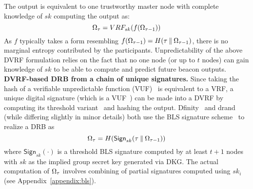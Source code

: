 The output is equivalent to one trustworthy master node with complete knowledge of $sk$ computing the output as:
\[
\Omega_\tau = VRF_{sk}(f(\Omega_{\tau - 1}))
\]
As $f$ typically takes a form resembling $f(\Omega_{\tau - 1}) = H(\tau \mathbin\Vert \Omega_{\tau - 1})$, there is no marginal entropy contributed by the participants. Unpredictability of the above DVRF formulation relies on the fact that no one node (or up to $t$ nodes) can gain knowledge of $sk$ to be able to compute and predict future beacon outputs.\\

\noindent\textbf{DVRF-based DRB from a chain of unique signatures.} Since taking the hash of a verifiable unpredictable function (VUF)~\cite{micali1999verifiable} is equivalent to a VRF, a unique digital signature (which is a VUF~\cite{dodis2005verifiable}) can be made into a DVRF by computing its threshold variant~\cite{boldyreva2003threshold} and hashing the output. Dfinity~\cite{hanke2018dfinity} and drand~\cite{drand} (while differing slightly in minor details) both use the BLS signature scheme~\cite{boneh2001short} to realize a DRB as
\[
\Omega_\tau = H(\mathsf{Sign}_{sk}(\tau \mathbin\Vert \Omega_{\tau - 1}))
\]
where $\mathsf{Sign}_{sk}(\cdot)$ is a threshold BLS signature computed by at least $t + 1$ nodes with $sk$ as the implied group secret key generated via DKG. The actual computation of $\Omega_\tau$ involves combining of partial signatures computed using $sk_i$ (see Appendix~\ref{appendix:bls}).\\

